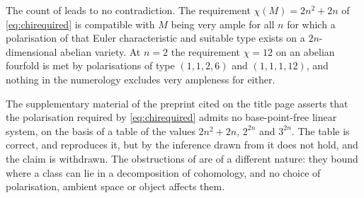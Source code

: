 \begin{corollary}\label{cor:nonumerical}
The count of  leads to no contradiction. The
requirement $\chi(M)=2n^{2}+2n$ of \eqref{eq:chirequired} is compatible with
$M$ being very ample for all $n$ for which a polarisation of that Euler
characteristic and suitable type exists on a $2n$-dimensional abelian
variety. At $n=2$ the requirement $\chi=12$ on an abelian fourfold is met by
polarisations of type $(1,1,2,6)$ and $(1,1,1,12)$, and nothing in the
numerology excludes very ampleness for either.
\end{corollary}

\begin{remark}\label{rem:retract}
The supplementary material of the preprint cited on the title page asserts that the polarisation required by \eqref{eq:chirequired} admits no
base-point-free linear system, on the basis of a table of the values
$2n^{2}+2n$, $2^{2n}$ and $3^{2n}$. The table is correct, and
 reproduces it, but by  the
inference drawn from it does not hold, and the claim is withdrawn. The obstructions of
 are of a different nature: they bound where
a class can lie in a decomposition of cohomology, and no choice of
polarisation, ambient space or object affects them.
\end{remark}
